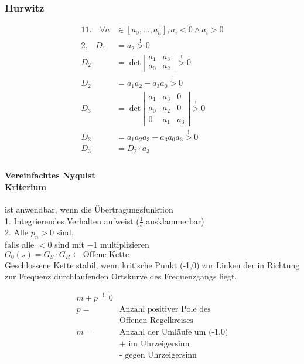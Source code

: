 \documentclass{article}
\begin{document}
\begin{landscape}
\begin{multicols}{2}
\begin{multicols}{2}
\begin{multicols}{2}
\subsubsection*{Hurwitz}
\begin{alignat*}
	11. \quad \forall a &\in \left[a_0, \ldots,  a_n\right] , a_i<0 \wedge a_i>0 \\
	2. \quad D_1 &= a_2 \overset{!}{>} 0 \\
	D_{2} &=\operatorname{det}\left|
		\begin{array}{ll}a_{1} & a_{3} \\ 
		a_{0} & a_{2}
	\end{array}\right| \overset{!}{>}0\\
	D_{2} &=a_{1} a_{2}-a_{3} a_{0}\overset{!}{>}0 \\
	D_{3} &=\operatorname{det}\left|
		\begin{array}{lll}a_{1} & a_{3} & 0 \\
				  a_{0} & a_{2} & 0 \\
		                  0 & a_{1} & a_{3}
		\end{array}
		\right| \overset{!}{>} 0\\
	D_{3} &=a_{1} a_{2} a_{3}-a_{3} a_{0} a_{3}\overset{!}{>}0 \\
	D_3 & = D_2 \cdot a_3 \\
\end{alignat*}

\paragraph{Vereinfachtes Nyquist \\ Kriterium} ist anwendbar, wenn die Übertragungsfunktion \\
1. Integrierendes Verhalten aufweist ($\frac{1}{s}$ ausklammerbar) \\
2. Alle $p_n > 0$ sind,\\ falls alle $< 0$ sind mit $-1$ multiplizieren \\
$G_0(s) = G_S \cdot G_R \leftarrow \text{Offene Kette}$ \\
Geschlossene Kette stabil, wenn kritische Punkt (-1,0) zur Linken der in Richtung zur Frequenz durchlaufenden Ortskurve des Frequenzgangs liegt.

\begin{align*}
	m + p \overset{!}{=} 0 \\
	p = &\text{Anzahl positiver Pole des} \\ & \text{Offenen Regelkreises} \\
	m = &\text{Anzahl der Umläufe um (-1,0)} \\ &\text{+ im Uhrzeigersinn } \\&\text{- gegen Uhrzeigersinn } \\
\end{align*}


\end{multicols}
\end{multicols}
\end{multicols}
\end{landscape}
\end{document}
